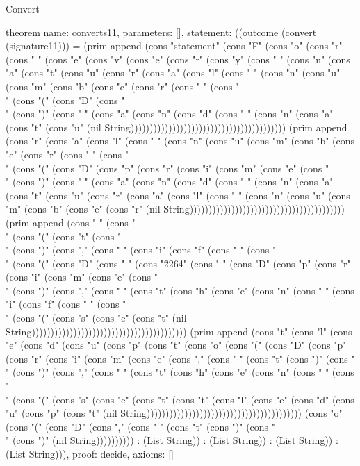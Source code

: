 \begin{lexlean}{Convert}
\begin{semanticmodule}
theorem{
  name: converts11,
  parameters: [],
  statement: ((outcome (convert (signature11))) = (prim append (cons "statement" (cons "F" (cons "o" (cons "r" (cons " " (cons "e" (cons "v" (cons "e" (cons "r" (cons "y" (cons " " (cons "n" (cons "a" (cons "t" (cons "u" (cons "r" (cons "a" (cons "l" (cons " " (cons "n" (cons "u" (cons "m" (cons "b" (cons "e" (cons "r" (cons " " (cons "\\" (cons "(" (cons "D" (cons "\\" (cons ")" (cons " " (cons "a" (cons "n" (cons "d" (cons " " (cons "n" (cons "a" (cons "t" (cons "u" (nil String))))))))))))))))))))))))))))))))))))))))) (prim append (cons "r" (cons "a" (cons "l" (cons " " (cons "n" (cons "u" (cons "m" (cons "b" (cons "e" (cons "r" (cons " " (cons "\\" (cons "(" (cons "D" (cons "p" (cons "r" (cons "i" (cons "m" (cons "e" (cons "\\" (cons ")" (cons " " (cons "a" (cons "n" (cons "d" (cons " " (cons "n" (cons "a" (cons "t" (cons "u" (cons "r" (cons "a" (cons "l" (cons " " (cons "n" (cons "u" (cons "m" (cons "b" (cons "e" (cons "r" (nil String))))))))))))))))))))))))))))))))))))))))) (prim append (cons " " (cons "\\" (cons "(" (cons "t" (cons "\\" (cons ")" (cons "," (cons " " (cons "i" (cons "f" (cons " " (cons "\\" (cons "(" (cons "D" (cons " " (cons "\u2264" (cons " " (cons "D" (cons "p" (cons "r" (cons "i" (cons "m" (cons "e" (cons "\\" (cons ")" (cons "," (cons " " (cons "t" (cons "h" (cons "e" (cons "n" (cons " " (cons "i" (cons "f" (cons " " (cons "\\" (cons "(" (cons "s" (cons "e" (cons "t" (nil String))))))))))))))))))))))))))))))))))))))))) (prim append (cons "t" (cons "l" (cons "e" (cons "d" (cons "u" (cons "p" (cons "t" (cons "o" (cons "(" (cons "D" (cons "p" (cons "r" (cons "i" (cons "m" (cons "e" (cons "," (cons " " (cons "t" (cons ")" (cons "\\" (cons ")" (cons "," (cons " " (cons "t" (cons "h" (cons "e" (cons "n" (cons " " (cons "\\" (cons "(" (cons "s" (cons "e" (cons "t" (cons "t" (cons "l" (cons "e" (cons "d" (cons "u" (cons "p" (cons "t" (nil String))))))))))))))))))))))))))))))))))))))))) (cons "o" (cons "(" (cons "D" (cons "," (cons " " (cons "t" (cons ")" (cons "\\" (cons ")" (nil String)))))))))) : (List String)) : (List String)) : (List String)) : (List String))),
  proof: decide{},
  axioms: []
}


\end{semanticmodule}
\end{lexlean}
